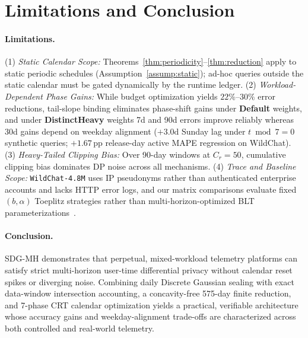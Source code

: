 \documentclass[sigconf, nonacm]{acmart}
\begin{document}
\section{Limitations and Conclusion}
\label{sec:conclusion}

\paragraph{Limitations.}
(1) \emph{Static Calendar Scope:} Theorems~\ref{thm:periodicity}--\ref{thm:reduction} apply to static periodic schedules (Assumption~\ref{assump:static}); ad-hoc queries outside the static calendar must be gated dynamically by the runtime ledger.
(2) \emph{Workload-Dependent Phase Gains:} While budget optimization yields $22\%$--$30\%$ error reductions, tail-slope binding eliminates phase-shift gains under \textbf{Default} weights, and under \textbf{DistinctHeavy} weights 7d and 90d errors improve reliably whereas 30d gains depend on weekday alignment ($+3.0\text{d}$ Sunday lag under $t \bmod 7 = 0$ synthetic queries; $+1.67\,\text{pp}$ release-day active MAPE regression on WildChat).
(3) \emph{Heavy-Tailed Clipping Bias:} Over 90-day windows at $C_r=50$, cumulative clipping bias dominates DP noise across all mechanisms.
(4) \emph{Trace and Baseline Scope:} \texttt{WildChat-4.8M} uses IP pseudonyms rather than authenticated enterprise accounts and lacks HTTP error logs, and our matrix comparisons evaluate fixed $(b, \alpha)$ Toeplitz strategies rather than multi-horizon-optimized BLT parameterizations~\cite{mcmahan2025blt}.

\paragraph{Conclusion.}
SDG-MH demonstrates that perpetual, mixed-workload telemetry platforms can satisfy strict multi-horizon user-time differential privacy without calendar reset spikes or diverging noise. Combining daily Discrete Gaussian sealing with exact data-window intersection accounting, a concavity-free 575-day finite reduction, and 7-phase CRT calendar optimization yields a practical, verifiable architecture whose accuracy gains and weekday-alignment trade-offs are characterized across both controlled and real-world telemetry.



\end{document}

